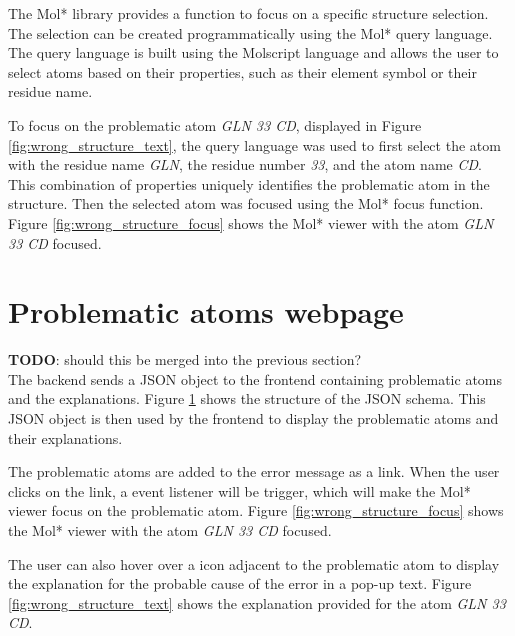\documentclass[
  digital,     %
  oneside,     %
  nosansbold,  %
  nocolorbold, %
  lof,         %
  lot,         %
]{fithesis4}
\begin{document}
The Mol* library provides a function to focus on a specific structure selection. The selection can be created programmatically using the Mol* query language. The query language is built using the Molscript language \cite{kraulis1991molscript} and allows the user to select atoms based on their properties, such as their element symbol or their residue name.

To focus on the problematic atom \textit{GLN 33 CD}, displayed in Figure \ref{fig:wrong_structure_text}, the query language was used to first select the atom with the residue name \textit{GLN}, the residue number \textit{33}, and the atom name \textit{CD}. This combination of properties uniquely identifies the problematic atom in the structure. Then the selected atom was focused using the Mol* focus function. Figure \ref{fig:wrong_structure_focus} shows the Mol* viewer with the atom \textit{GLN 33 CD} focused.


\section{Problematic atoms webpage}

\textbf{TODO}: should this be merged into the previous section? \\ 

The backend sends a JSON object to the frontend containing problematic atoms and the explanations. Figure \ref{} shows the structure of the JSON schema. This JSON object is then used by the frontend to display the problematic atoms and their explanations.

The problematic atoms are added to the error message as a link. When the user clicks on the link, a event listener will be trigger, which will make the Mol* viewer focus on the problematic atom. Figure \ref{fig:wrong_structure_focus} shows the Mol* viewer with the atom \textit{GLN 33 CD} focused.

The user can also hover over a icon adjacent to the problematic atom to display the explanation for the probable cause of the error in a pop-up text. Figure \ref{fig:wrong_structure_text} shows the explanation provided for the atom \textit{GLN 33 CD}.
\end{document}
